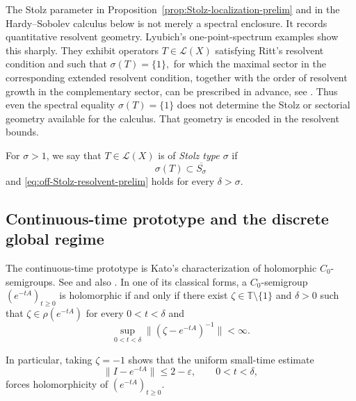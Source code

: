 \documentclass[11pt]{amsart}
\numberwithin{equation}{section}
\theoremstyle{definition}
\theoremstyle{plain}
\def\L{L}
\renewcommand{\L}{\mathcal L}
\begin{document}
The Stolz parameter in Proposition~\ref{prop:Stolz-localization-prelim} and in the Hardy--Sobolev calculus below is not merely a spectral enclosure. It records quantitative resolvent geometry.  Lyubich's one-point-spectrum examples show this sharply.  They exhibit  operators $T \in \L(X)$ satisfying Ritt's resolvent condition and such that 
\(
   \sigma(T)=\{1\},
\)
for which the maximal sector in the corresponding extended resolvent condition, together with the order of resolvent growth in the complementary sector, can be prescribed in advance, see \cite{Lyubich-single-point}.  Thus even the spectral equality $\sigma(T)=\{1\}$ does not determine the Stolz or sectorial geometry available for the calculus. That geometry is encoded in the resolvent bounds.


For \(\sigma>1\), we say that \(T\in\L(X)\) is of
\emph{Stolz type \(\sigma\)} if
\[
   \sigma(T)\subset\overline{S_\sigma}
\]
and \eqref{eq:off-Stolz-resolvent-prelim} holds for every
\(\delta>\sigma\).

\subsection{Continuous-time prototype and the discrete global re\-gime}

The continuous-time prototype is Kato's characterization of holomorphic $C_0$-semi\-groups. See \cite{Kato} and also \cite{Beurling,Fackler}. 
In one of its classical forms, a \(C_0\)-semigroup
\((e^{-tA})_{t\ge0}\) is holomorphic if and only if there exist
\(\zeta\in\mathbb T\setminus\{1\}\) and \(\delta>0\) such that
\(\zeta\in\rho(e^{-tA})\) for every \(0<t<\delta\) and
\begin{equation}\label{resest}
  \sup_{0<t<\delta}\|(\zeta-e^{-tA})^{-1}\|<\infty.
\end{equation}

 In particular, taking $\zeta=-1$ shows that the uniform small-time estimate
\[
  \|I-e^{-tA}\|\le 2-\varepsilon,\qquad 0<t<\delta,
\]
forces holomorphicity of \((e^{-tA})_{t\ge0}\).
\end{document}
